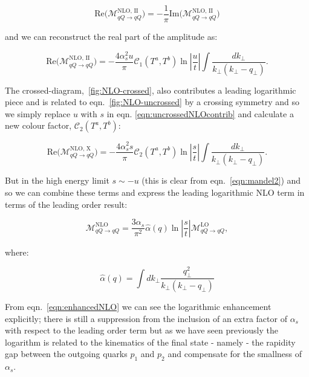 		\begin{equation}
			\text{Re}\Big(\mathcal{M}_{qQ\rightarrow qQ}^{\text{NLO, II}}\Big) =
			-\frac{1}{\pi}\text{Im}\Big(\mathcal{M}_{qQ\rightarrow qQ}^{\text{NLO, II}}\Big)
		\end{equation}

		and we can reconstruct the real part of the amplitude as:

		\begin{equation}
			\text{Re}\Big(\mathcal{M}_{qQ\rightarrow qQ}^{\text{NLO, II}}\Big) =
			-\frac{4\alpha_s^2u}{\pi} \mathcal{C}_1(T^a,T^b)
			\ln\left|\frac{u}{t}\right|\int \frac{dk_{\perp}}{k_{\perp}(k_{\perp} - q_{\perp})}.
			\label{eqn:uncrossedNLOcontrib}
		\end{equation}

		The crossed-diagram,~\eqref{fig:NLO-crossed}, also contributes a leading logarithmic piece and is related to
		eqn.~\eqref{fig:NLO-uncrossed} by a crossing symmetry and so we simply replace $u$ with $s$ in eqn.
		\eqref{eqn:uncrossedNLOcontrib} and calculate a new colour factor, $\mathcal{C}_2(T^a,T^b)$:

		\begin{equation}
			\text{Re}\Big(\mathcal{M}_{qQ\rightarrow qQ}^{\text{NLO, X}}\Big) =
			-\frac{4\alpha_s^2s}{\pi} \mathcal{C}_2(T^a,T^b)
			\ln\left|\frac{s}{t}\right| \int \frac{dk_{\perp}}{k_{\perp}(k_{\perp} - q_{\perp})}.
			\label{eqn:crossedNLOcontrib}
		\end{equation}

		But in the high energy limit $s\sim -u$ (this is clear from eqn.~\eqref{eqn:mandel2}) and so we
		can combine these terms and express the leading logarithmic NLO term in terms of the leading order
		result:

		\begin{equation}
			\mathcal{M}_{qQ\rightarrow qQ}^{\text{NLO}} = \frac{3\alpha_s}{\pi^2}
			\hat{\alpha}(q)\ln\left|\frac{s}{t}\right|
			\mathcal{M}_{qQ\rightarrow qQ}^{\text{LO}},
			\label{eqn:enhancedNLO}
		\end{equation}

		where:

		\begin{equation}
			\hat{\alpha}(q) = \int dk_{\perp}\frac{q_{\perp}^2}{k_{\perp}(k_{\perp} - q_{\perp})}
		\end{equation}

		From eqn.~\eqref{eqn:enhancedNLO} we can see the logarithmic enhancement explicitly; there is still
		a suppression from the inclusion of an extra factor of $\alpha_s$ with respect to the leading
		order term but as we have seen previously the logarithm is related to the kinematics of the final
		state - namely - the rapidity gap between the outgoing quarks $p_1$ and $p_2$ and compensate
		for the smallness of $\alpha_s$.

